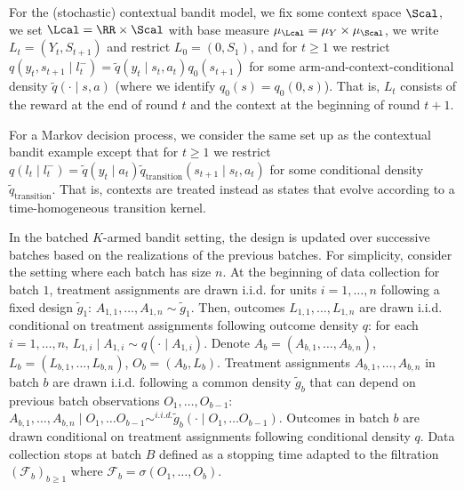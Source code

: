 \begin{example}\label{ex:cb} For the (stochastic) contextual bandit model, we fix some context space $\Scal$, we set $\Lcal=\RR\times\Scal$ with base measure $\mu_\Lcal=\mu_Y\times\mu_\Scal$, we write $L_t=(Y_t,S_{t+1})$ and restrict $L_0=(0,S_1)$, and for $t\geq1$ we restrict $q(y_t,s_{t+1} \mid l_t^-) = \widetilde q(y_t \mid s_t,a_t)q_0(s_{t+1})$ for some arm-and-context-conditional density $\widetilde q(\cdot \mid s,a)$ (where we identify $q_0(s)=q_0(0,s)$). That is, $L_t$ consists of the reward at the end of round $t$ and the context at the beginning of round $t+1$.\end{example}

\begin{example}\label{ex:mdp} For a Markov decision process, we consider the same set up as the contextual bandit example except that for $t\geq1$ we restrict $q(l_t \mid l_t^-) = \widetilde q(y_t \mid a_t)\widetilde q_{\mathrm{transition}}(s_{t+1}\mid s_t,a_t)$ for some conditional density $\widetilde q_{\mathrm{transition}}$. That is, contexts are treated instead as states that evolve according to a time-homogeneous transition kernel.\end{example}

\begin{example}\label{ex:batch} In the batched $K$-armed bandit setting, the design is updated over successive batches based on the realizations of the previous batches. For simplicity, consider the setting where each batch has size $n$. At the beginning of data collection for batch $1$, treatment assignments are drawn i.i.d. for units $i=1,\ldots,n$ following a fixed design $\widetilde g_1$: $A_{1,1},\ldots,A_{1,n} \sim \widetilde g_1$. Then, outcomes $L_{1,1},\ldots,L_{1,n}$ are drawn i.i.d. conditional on treatment assignments following outcome density $q$: for each $i=1,\ldots,n$, $L_{1,i} \mid A_{1,i} \sim q(\cdot \mid A_{1,i})$. Denote $A_b = (A_{b,1},\ldots, A_{b,n})$, $L_b = (L_{b,1},\ldots,L_{b,n})$, $O_b = (A_b, L_b)$. Treatment assignments $A_{b,1},\ldots, A_{b,n}$ in batch $b$ are drawn i.i.d. following a common density $\widetilde g_b$ that can depend on previous batch observations $O_1,\ldots, O_{b-1}$: $A_{b,1},\ldots, A_{b,n} \mid O_1,\ldots O_{b-1} \sim^{i.i.d.} \widetilde g_b(\cdot \mid O_1,\ldots O_{b-1})$. Outcomes in batch $b$ are drawn conditional on treatment assignments following conditional density $q$. Data collection stops at batch $B$ defined as a stopping time adapted to the filtration $(\mathcal{F}_b)_{b \geq 1}$ where $\mathcal{F}_b = \sigma(O_1,\ldots, O_b)$.\end{example}






